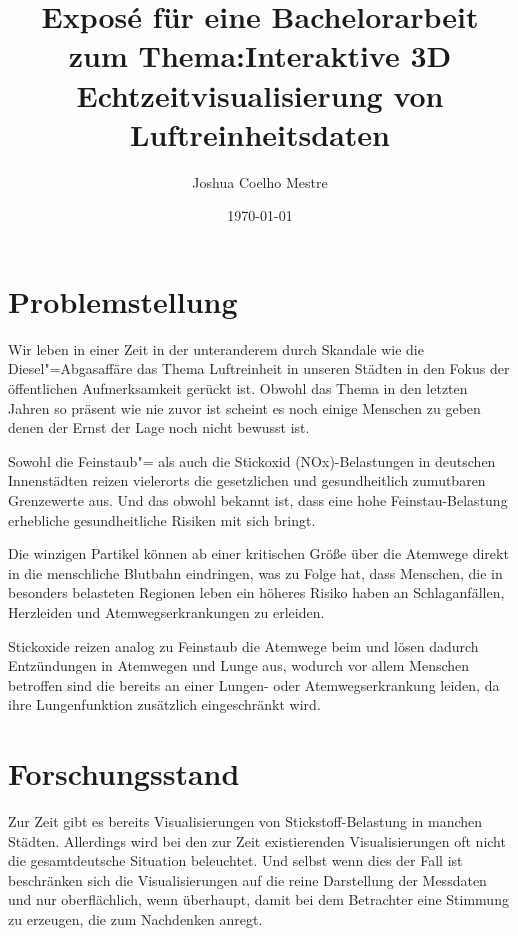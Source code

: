\documentclass[12pt]{article} %
\title{Exposé für eine Bachelorarbeit zum Thema:\newline Interaktive 3D Echtzeitvisualisierung von Luftreinheitsdaten}
\author{Joshua Coelho Mestre}
\date{\today} %
\begin{document}
\maketitle
\newpage
\tableofcontents %
\newpage %

\section{Problemstellung} \label{sec:Problemstellung}

Wir leben in einer Zeit in der unteranderem durch Skandale wie die Diesel"=Abgasaffäre das Thema Luftreinheit in unseren Städten in den Fokus der öffentlichen Aufmerksamkeit gerückt ist.
Obwohl das Thema in den letzten Jahren so präsent wie nie zuvor ist scheint es noch einige Menschen zu geben denen der Ernst der Lage noch nicht bewusst ist.

Sowohl die Feinstaub"= als auch die Stickoxid (NOx)-Belastungen in deutschen Innenstädten reizen vielerorts die gesetzlichen und gesundheitlich zumutbaren Grenzewerte aus. Und das obwohl bekannt ist, dass eine hohe Feinstau-Belastung erhebliche gesundheitliche Risiken mit sich bringt.

Die winzigen Partikel können ab einer kritischen Größe über die Atemwege direkt in die menschliche Blutbahn eindringen, was zu Folge hat, dass Menschen, die in besonders belasteten Regionen leben ein höheres Risiko haben an Schlaganfällen, Herzleiden und Atemwegserkrankungen zu erleiden.

Stickoxide reizen analog zu Feinstaub die Atemwege beim und lösen dadurch Entzündungen in Atemwegen und Lunge aus, wodurch vor allem Menschen betroffen sind die bereits an einer Lungen- oder Atemwegserkrankung leiden, da ihre Lungenfunktion zusätzlich eingeschränkt wird\cite{zo:StickoxideUndFeinstaub}.

\section{Forschungsstand} \label{sec:Forschungsstand}

Zur Zeit gibt es bereits Visualisierungen von Stickstoff-Belastung in manchen Städten. 
Allerdings wird bei den zur Zeit existierenden Visualisierungen oft nicht die gesamtdeutsche Situation beleuchtet.
Und selbst wenn dies der Fall ist beschränken sich die Visualisierungen auf die reine Darstellung der Messdaten und nur oberflächlich, wenn überhaupt, damit bei dem Betrachter eine Stimmung zu erzeugen, die zum Nachdenken anregt.
\end{document}
